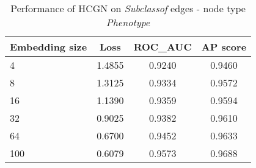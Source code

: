 \begin{table}[h]
    \centering
    \begin{tabular}{lccc}        
        \toprule
        \textbf{Embedding size} & \textbf{Loss} & \textbf{ROC\_AUC} & \textbf{AP score} \\
        \midrule
        4 & 1.4855 & 0.9240 & 0.9460 \\
        8 & 1.3125 & 0.9334 & 0.9572 \\
        16 & 1.1390 & 0.9359 & 0.9594 \\
        32 & 0.9025 & 0.9382 & 0.9610 \\
        64 & 0.6700 & 0.9452 & 0.9633 \\
        100 & 0.6079 & 0.9573 & 0.9688 \\
        \bottomrule
    \end{tabular}
    \caption{Performance of HCGN on \textit{Subclassof} edges - node type \textit{Phenotype}}
\end{table}


